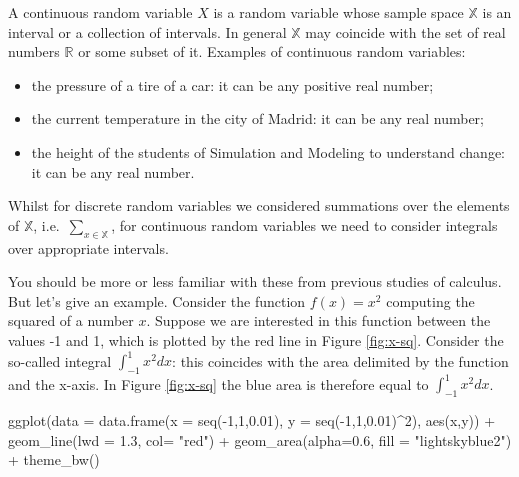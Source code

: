 \documentclass[
]{book}
\newenvironment{Shaded}{\begin{snugshade}}{\end{snugshade}}
\newcommand{\AttributeTok}[1]{\textcolor[rgb]{0.77,0.63,0.00}{#1}}
\newcommand{\DecValTok}[1]{\textcolor[rgb]{0.00,0.00,0.81}{#1}}
\newcommand{\FloatTok}[1]{\textcolor[rgb]{0.00,0.00,0.81}{#1}}
\newcommand{\FunctionTok}[1]{\textcolor[rgb]{0.00,0.00,0.00}{#1}}
\newcommand{\NormalTok}[1]{#1}
\newcommand{\SpecialCharTok}[1]{\textcolor[rgb]{0.00,0.00,0.00}{#1}}
\newcommand{\StringTok}[1]{\textcolor[rgb]{0.31,0.60,0.02}{#1}}
\theoremstyle{definition}
\theoremstyle{definition}
\theoremstyle{definition}
\theoremstyle{definition}
\theoremstyle{remark}
\begin{document}
A continuous random variable \(X\) is a random variable whose sample space \(\mathbb{X}\) is an interval or a collection of intervals. In general \(\mathbb{X}\) may coincide with the set of real numbers \(\mathbb{R}\) or some subset of it. Examples of continuous random variables:

\begin{itemize}
\item
  the pressure of a tire of a car: it can be any positive real number;
\item
  the current temperature in the city of Madrid: it can be any real number;
\item
  the height of the students of Simulation and Modeling to understand change: it can be any real number.
\end{itemize}

Whilst for discrete random variables we considered summations over the elements of \(\mathbb{X}\), i.e.~\(\sum_{x\in\mathbb{X}}\), for continuous random variables we need to consider integrals over appropriate intervals.

You should be more or less familiar with these from previous studies of calculus. But let's give an example. Consider the function \(f(x)=x^2\) computing the squared of a number \(x\). Suppose we are interested in this function between the values -1 and 1, which is plotted by the red line in Figure \ref{fig:x-sq}. Consider the so-called integral \(\int_{-1}^{1}x^2dx\): this coincides with the area delimited by the function and the x-axis. In Figure \ref{fig:x-sq} the blue area is therefore equal to \(\int_{-1}^{1}x^2dx\).

\begin{Shaded}
\begin{Highlighting}[]
\FunctionTok{ggplot}\NormalTok{(}\AttributeTok{data =} \FunctionTok{data.frame}\NormalTok{(}\AttributeTok{x =} \FunctionTok{seq}\NormalTok{(}\SpecialCharTok{{-}}\DecValTok{1}\NormalTok{,}\DecValTok{1}\NormalTok{,}\FloatTok{0.01}\NormalTok{), }\AttributeTok{y =} \FunctionTok{seq}\NormalTok{(}\SpecialCharTok{{-}}\DecValTok{1}\NormalTok{,}\DecValTok{1}\NormalTok{,}\FloatTok{0.01}\NormalTok{)}\SpecialCharTok{\^{}}\DecValTok{2}\NormalTok{), }\FunctionTok{aes}\NormalTok{(x,y)) }\SpecialCharTok{+} \FunctionTok{geom\_line}\NormalTok{(}\AttributeTok{lwd =} \FloatTok{1.3}\NormalTok{, }\AttributeTok{col=} \StringTok{"red"}\NormalTok{) }\SpecialCharTok{+} \FunctionTok{geom\_area}\NormalTok{(}\AttributeTok{alpha=}\FloatTok{0.6}\NormalTok{, }\AttributeTok{fill =} \StringTok{"lightskyblue2"}\NormalTok{) }\SpecialCharTok{+}  \FunctionTok{theme\_bw}\NormalTok{() }
\end{Highlighting}
\end{Shaded}
\end{document}
